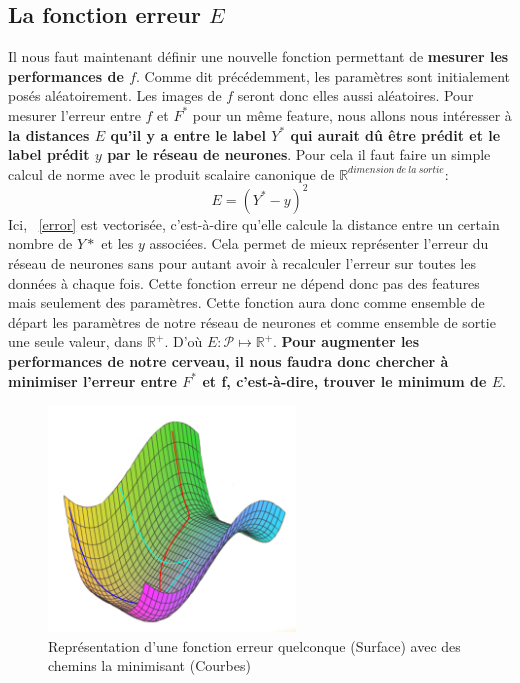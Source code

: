 \documentclass[12pt,a4paper]{extarticle}
\begin{document}
\subsection{La fonction erreur $E$}

Il nous faut maintenant définir une nouvelle fonction permettant de \textbf{mesurer les performances de $f$}. Comme dit précédemment, les paramètres sont initialement posés aléatoirement. Les images de $f$ seront donc elles aussi aléatoires. Pour mesurer l'erreur entre $f$ et $F^*$ pour un même feature, nous allons nous intéresser à \textbf{la distances $E$ qu'il y a entre le label $Y^*$ qui aurait dû être prédit et le label prédit $y$ par le réseau de neurones}. Pour cela il faut faire un simple calcul de norme avec le produit scalaire canonique de $\mathbb R ^{dimension\ de\ la\ sortie}$:
\begin{equation}
E=(Y^*-y)^2
\label{error}
\end{equation}
Ici, ~\eqref{error} est vectorisée, c'est-à-dire qu'elle calcule la distance entre un certain nombre de $ Y*$ et les $y$ associées. Cela permet de mieux représenter l'erreur du réseau de neurones sans pour autant avoir à recalculer l'erreur sur toutes les données à chaque fois. Cette fonction erreur ne dépend donc pas des features mais seulement des paramètres. Cette fonction aura donc comme ensemble de départ les paramètres de notre réseau de neurones et comme ensemble de sortie une seule valeur, dans $\mathbb R ^+$. D'où $E:\mathcal P \mapsto \mathbb R^+$. \textbf{Pour augmenter les performances de notre cerveau, il nous faudra donc chercher à minimiser l'erreur entre $F^*$ et f, c'est-à-dire, trouver le minimum de $E$}. 

\begin{figure}[h]
        \centering
        \includegraphics[height=6cm]{curve}
        \caption{Représentation d'une fonction erreur quelconque (Surface) avec des chemins la minimisant (Courbes)} \end{figure}
\end{document}
